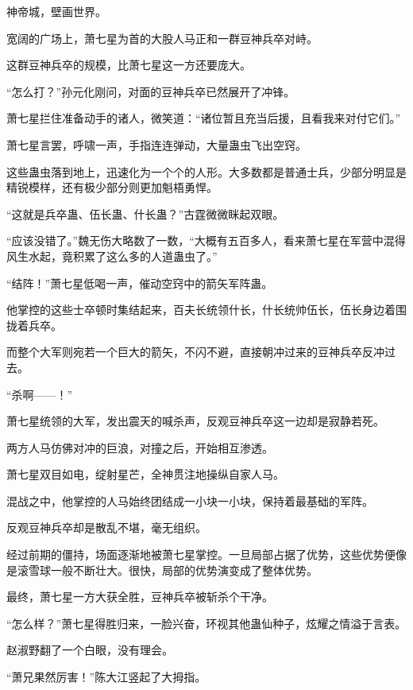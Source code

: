 
\begin{this_body}

神帝城，壁画世界。

宽阔的广场上，萧七星为首的大股人马正和一群豆神兵卒对峙。

这群豆神兵卒的规模，比萧七星这一方还要庞大。

“怎么打？”孙元化刚问，对面的豆神兵卒已然展开了冲锋。

萧七星拦住准备动手的诸人，微笑道：“诸位暂且充当后援，且看我来对付它们。”

萧七星言罢，呼啸一声，手指连连弹动，大量蛊虫飞出空窍。

这些蛊虫落到地上，迅速化为一个个的人形。大多数都是普通士兵，少部分明显是精锐模样，还有极少部分则更加魁梧勇悍。

“这就是兵卒蛊、伍长蛊、什长蛊？”古霆微微眯起双眼。

“应该没错了。”魏无伤大略数了一数，“大概有五百多人，看来萧七星在军营中混得风生水起，竟积累了这么多的人道蛊虫了。”

“结阵！”萧七星低喝一声，催动空窍中的箭矢军阵蛊。

他掌控的这些士卒顿时集结起来，百夫长统领什长，什长统帅伍长，伍长身边着围拢着兵卒。

而整个大军则宛若一个巨大的箭矢，不闪不避，直接朝冲过来的豆神兵卒反冲过去。

“杀啊——！”

萧七星统领的大军，发出震天的喊杀声，反观豆神兵卒这一边却是寂静若死。

两方人马仿佛对冲的巨浪，对撞之后，开始相互渗透。

萧七星双目如电，绽射星芒，全神贯注地操纵自家人马。

混战之中，他掌控的人马始终团结成一小块一小块，保持着最基础的军阵。

反观豆神兵卒却是散乱不堪，毫无组织。

经过前期的僵持，场面逐渐地被萧七星掌控。一旦局部占据了优势，这些优势便像是滚雪球一般不断壮大。很快，局部的优势演变成了整体优势。

最终，萧七星一方大获全胜，豆神兵卒被斩杀个干净。

“怎么样？”萧七星得胜归来，一脸兴奋，环视其他蛊仙种子，炫耀之情溢于言表。

赵淑野翻了一个白眼，没有理会。

“萧兄果然厉害！”陈大江竖起了大拇指。


\end{this_body}
